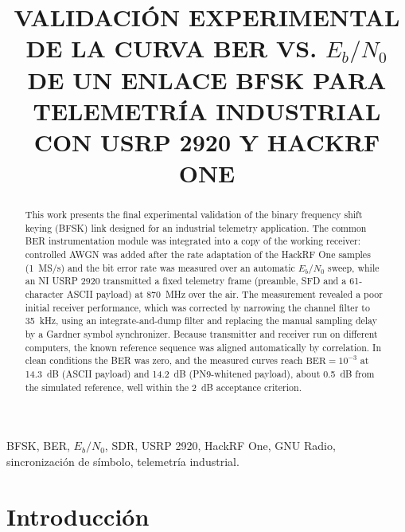 \documentclass[conference]{IEEEtran}
\begin{document}
\title{VALIDACIÓN EXPERIMENTAL DE LA CURVA BER VS. $E_b/N_0$ DE UN ENLACE BFSK PARA TELEMETRÍA INDUSTRIAL CON USRP 2920 Y HACKRF ONE}

\author{
}

\maketitle

\begin{abstract}
This work presents the final experimental validation of the binary frequency shift keying (BFSK) link designed for an industrial telemetry application. The common BER instrumentation module was integrated into a copy of the working receiver: controlled AWGN was added after the rate adaptation of the HackRF One samples (1~MS/s) and the bit error rate was measured over an automatic $E_b/N_0$ sweep, while an NI USRP 2920 transmitted a fixed telemetry frame (preamble, SFD and a 61-character ASCII payload) at 870~MHz over the air. The measurement revealed a poor initial receiver performance, which was corrected by narrowing the channel filter to 35~kHz, using an integrate-and-dump filter and replacing the manual sampling delay by a Gardner symbol synchronizer. Because transmitter and receiver run on different computers, the known reference sequence was aligned automatically by correlation. In clean conditions the BER was zero, and the measured curves reach $\text{BER} = 10^{-3}$ at 14.3~dB (ASCII payload) and 14.2~dB (PN9-whitened payload), about 0.5~dB from the simulated reference, well within the 2~dB acceptance criterion.
\end{abstract}

\begin{IEEEkeywords}
BFSK, BER, $E_b/N_0$, SDR, USRP 2920, HackRF One, GNU Radio, sincronización de símbolo, telemetría industrial.
\end{IEEEkeywords}

\section{Introducción}
\end{document}
